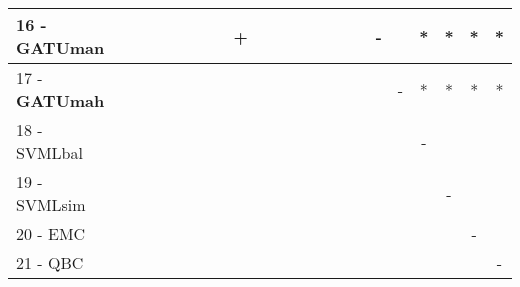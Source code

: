 \begin{table}[h]
\begin{center}
\begin{tabular}{lcc|cc|cc|cc|cc|cc|cc|cc|cc|cc|c}
16 - \textbf{GATUman}	&   &   &   &   &   &   &   & + &   &   &   &   &   &   &   & - &   & * & * & * & * \\ \hline
17 - \textbf{GATUmah}	&   &   &   &   &   &   &   &   &   &   &   &   &   &   &   &   & - & * & * & * & * \\
18 - SVMLbal	&   &   &   &   &   &   &   &   &   &   &   &   &   &   &   &   &   & - &   &   &   \\ \hline
19 - SVMLsim	&   &   &   &   &   &   &   &   &   &   &   &   &   &   &   &   &   &   & - &   &   \\
20 - EMC  	&   &   &   &   &   &   &   &   &   &   &   &   &   &   &   &   &   &   &   & - &   \\ \hline
21 - QBC  	&   &   &   &   &   &   &   &   &   &   &   &   &   &   &   &   &   &   &   &   & - \\\end{tabular}
\label{stratsALCKappaFriedNBRedux}
\end{center}
\end{table}
